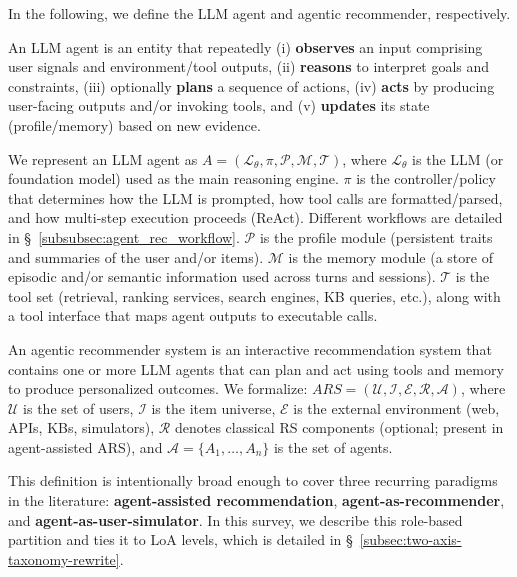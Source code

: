 In the following, we define the LLM agent and agentic recommender, respectively. 
\vspace{2pt}
\begin{definition}
An LLM agent is an entity that repeatedly (i) \textbf{observes} an input comprising user signals and environment/tool outputs, (ii) \textbf{reasons} to interpret goals and constraints, (iii) optionally \textbf{plans} a sequence of actions, (iv) \textbf{acts} by producing user-facing outputs and/or invoking tools, and (v) \textbf{updates} its state (profile/memory) based on new evidence.
\end{definition} 
We represent an LLM agent as $A = (\mathcal{L}_\theta, \pi, \mathcal{P}, \mathcal{M}, \mathcal{T})$, where $\mathcal{L}_\theta$ is the LLM (or foundation model) used as the main reasoning engine.
\(\pi\) is the {controller/policy} that determines how the LLM is prompted, how tool calls are formatted/parsed, and how multi-step execution proceeds (\eg ReAct). 
Different workflows are detailed in \S~\ref{subsubsec:agent_rec_workflow}. 
\(\mathcal{P}\) is the {profile module} (persistent traits and summaries of the user and/or items). 
\(\mathcal{M}\) is the {memory module} (a store of episodic and/or semantic information used across turns and sessions). 
\(\mathcal{T}\) is the {tool set} (retrieval, ranking services, search engines, KB queries, etc.), along with a tool interface that maps agent outputs to executable calls.



\begin{definition}
An agentic recommender system is an interactive recommendation system that contains one or more LLM agents that can plan and act using tools and memory to produce personalized outcomes. 
We formalize: $ARS = (\mathcal{U}, \mathcal{I}, \mathcal{E}, \mathcal{R}, \mathcal{A})$, 
where \(\mathcal{U}\) is the set of users, \(\mathcal{I}\) is the item universe, \(\mathcal{E}\) is the external environment (web, APIs, KBs, simulators), \(\mathcal{R}\) denotes classical RS components (optional; present in agent-assisted ARS), and \(\mathcal{A}=\{A_1, \dots, A_n\}\) is the set of agents.
\end{definition}


This definition is intentionally broad enough to cover three recurring paradigms in the literature: \textbf{agent-assisted recommendation}, \textbf{agent-as-recommender}, and \textbf{agent-as-user-simulator}. In this survey, we describe this role-based partition and ties it to LoA levels, which is detailed in \S~\ref{subsec:two-axis-taxonomy-rewrite}. 




